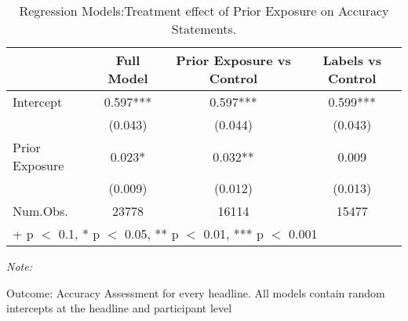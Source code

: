 \begin{table}

\caption{Regression Models:Treatment effect of Prior Exposure on Accuracy Statements.}
\centering
\begin{threeparttable}
\begin{tabular}[t]{lccc}
\toprule
  & Full Model & Prior Exposure vs Control & Labels vs Control\\
\midrule
Intercept & 0.597*** & 0.597*** & 0.599***\\
 & (0.043) & (0.044) & (0.043)\\
Prior Exposure & 0.023* & 0.032** & 0.009\\
 & (0.009) & (0.012) & (0.013)\\
\midrule
Num.Obs. & 23778 & 16114 & 15477\\
\bottomrule
\multicolumn{4}{l}{\rule{0pt}{1em}+ p $<$ 0.1, * p $<$ 0.05, ** p $<$ 0.01, *** p $<$ 0.001}\\
\end{tabular}
\begin{tablenotes}
\item \textit{Note: } 
\item Outcome: Accuracy Assessment for every headline. All models contain random intercepts at the headline and participant level
\end{tablenotes}
\end{threeparttable}
\end{table}
